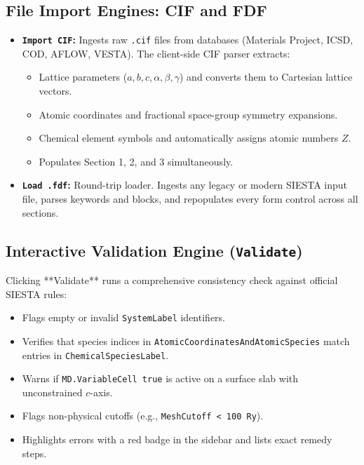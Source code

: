 \documentclass[11pt,a4paper]{article}
\begin{document}
\subsection{File Import Engines: CIF and FDF}
\begin{itemize}[leftmargin=*]
 \item \textbf{\texttt{Import CIF}:} Ingests raw \texttt{.cif} files from databases (Materials Project, ICSD, COD, AFLOW, VESTA). The client-side CIF parser extracts:
 \begin{itemize}
 \item Lattice parameters ($a, b, c, \alpha, \beta, \gamma$) and converts them to Cartesian lattice vectors.
 \item Atomic coordinates and fractional space-group symmetry expansions.
 \item Chemical element symbols and automatically assigns atomic numbers $Z$.
 \item Populates Section 1, 2, and 3 simultaneously.
 \end{itemize}
 \item \textbf{\texttt{Load .fdf}:} Round-trip loader. Ingests any legacy or modern SIESTA input file, parses keywords and blocks, and repopulates every form control across all sections.
\end{itemize}

\subsection{Interactive Validation Engine (\texttt{Validate})}
Clicking **Validate** runs a comprehensive consistency check against official SIESTA rules:
\begin{itemize}[leftmargin=*]
 \item Flags empty or invalid \texttt{SystemLabel} identifiers.
 \item Verifies that species indices in \texttt{AtomicCoordinatesAndAtomicSpecies} match entries in \texttt{ChemicalSpeciesLabel}.
 \item Warns if \texttt{MD.VariableCell true} is active on a surface slab with unconstrained $c$-axis.
 \item Flags non-physical cutoffs (e.g., \texttt{MeshCutoff < 100 Ry}).
 \item Highlights errors with a red badge in the sidebar and lists exact remedy steps.
\end{itemize}
\end{document}
